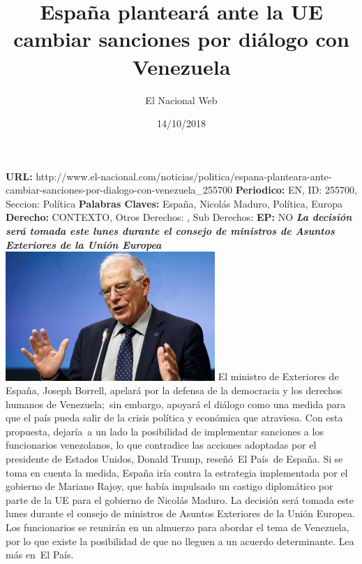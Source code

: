 \documentclass{article}%
\title{\textbf{España planteará ante la UE cambiar sanciones por diálogo con Venezuela}}%
\author{El Nacional Web}%
\date{14/10/2018}%
\begin{document}
%
\normalsize%
\maketitle%
\textbf{URL: }%
http://www.el{-}nacional.com/noticias/politica/espana{-}planteara{-}ante{-}cambiar{-}sanciones{-}por{-}dialogo{-}con{-}venezuela\_255700\newline%
%
\textbf{Periodico: }%
EN, %
ID: %
255700, %
Seccion: %
Política\newline%
%
\textbf{Palabras Claves: }%
España, Nicolás Maduro, Política, Europa\newline%
%
\textbf{Derecho: }%
CONTEXTO, %
Otros Derechos: %
, %
Sub Derechos: %
\newline%
%
\textbf{EP: }%
NO\newline%
\newline%
%
\textbf{\textit{La decisión será tomada este lunes durante el consejo de ministros de Asuntos Exteriores de la Unión Europea}}%
\newline%
\newline%
%
\includegraphics[width=300px]{107.jpg}%
\newline%
%
El ministro de Exteriores de España, Joseph Borrell, apelará por la defensa de la democracia y los derechos humanos de Venezuela;~sin embargo, apoyará el diálogo como una medida para que el país pueda salir de la crisis política y económica que atraviesa.%
\newline%
%
Con esta propuesta, dejaría~a un lado la posibilidad de implementar sanciones a los funcionarios venezolanos, lo que contradice las acciones adoptadas por el presidente de Estados Unidos, Donald Trump, reseñó~El País~de España.%
\newline%
%
Si se toma en cuenta la medida, España iría contra la estrategia implementada por el gobierno de Mariano Rajoy, que había impulsado un castigo diplomático por parte de la UE para el gobierno de Nicolás Maduro.%
\newline%
%
La decisión será tomada este lunes durante el consejo de ministros de Asuntos Exteriores de la Unión Europea. Los funcionarios se reunirán en un almuerzo para abordar el tema de Venezuela, por lo que existe la posibilidad de que no lleguen a un acuerdo determinante.%
\newline%
%
Lea más en~El País.%
\newline%
%
\end{document}

